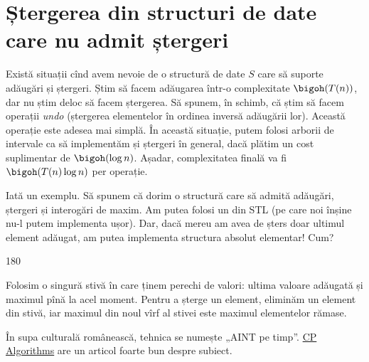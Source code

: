 \chapter{Ștergerea din structuri de date care nu admit ștergeri}

Există situații cînd avem nevoie de o structură de date $S$ care să suporte adăugări și ștergeri. Știm să facem adăugarea într-o complexitate $\bigoh(T(n))$, dar nu știm deloc să facem ștergerea. Să spunem, în schimb, că știm să facem operații \textit{undo} (ștergerea elementelor în ordinea inversă adăugării lor). Această operație este adesea mai simplă. În această situație, putem folosi arborii de intervale ca să implementăm și ștergeri în general, dacă plătim un cost suplimentar de $\bigoh(\log n)$. Așadar, complexitatea finală va fi $\bigoh(T(n) \log n)$ per operație.

Iată un exemplu. Să spunem că dorim o structură care să admită adăugări, ștergeri și interogări de maxim. Am putea folosi un  din STL (pe care noi înșine nu-l putem implementa ușor). Dar, dacă mereu am avea de șters doar ultimul element adăugat, am putea implementa structura absolut elementar! Cum?

\begin{turn}{180}
  \begin{minipage}{\linewidth}
    Folosim o singură stivă în care ținem perechi de valori: ultima valoare adăugată și maximul pînă la acel moment. Pentru a șterge un element, eliminăm un element din stivă, iar maximul din noul vîrf al stivei este maximul elementelor rămase.
  \end{minipage}
\end{turn}

În supa culturală românească, tehnica se numește „AINT pe timp”. \href{https://cp-algorithms.com/data_structures/deleting_in_log_n.html}{CP Algorithms} are un articol foarte bun despre subiect.
